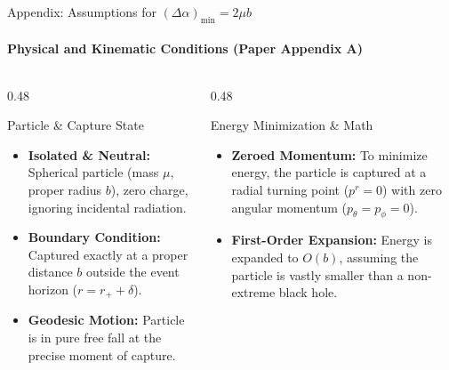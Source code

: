\documentclass[aspectratio=169]{beamer}
\begin{document}
\begin{frame}{Appendix: Assumptions for $(\Delta\alpha)_{\min} = 2\mu b$}
\framesubtitle{Physical and Kinematic Conditions (Paper Appendix A)}

\begin{columns}[T]
\begin{column}{0.48\textwidth}
  \begin{block}{Particle \& Capture State}
  \begin{itemize}
    \item \textbf{Isolated \& Neutral:} Spherical particle (mass $\mu$, proper radius $b$), zero charge, ignoring incidental radiation.
    \item \textbf{Boundary Condition:} Captured exactly at a proper distance $b$ outside the event horizon ($r = r_+ + \delta$).
    \item \textbf{Geodesic Motion:} Particle is in pure free fall at the precise moment of capture.
  \end{itemize}
  \end{block}
\end{column}

\begin{column}{0.48\textwidth}
  \begin{block}{Energy Minimization \& Math}
  \begin{itemize}
    \item \textbf{Zeroed Momentum:} To minimize energy, the particle is captured at a radial turning point ($p^r = 0$) with zero angular momentum ($p_\theta = p_\phi = 0$).
    \item \textbf{First-Order Expansion:} Energy is expanded to $O(b)$, assuming the particle is vastly smaller than a non-extreme black hole.
  \end{itemize}
  \end{block}
  
  \vspace{0.2cm}

\end{column}
\end{columns}
\end{frame}
\end{document}
